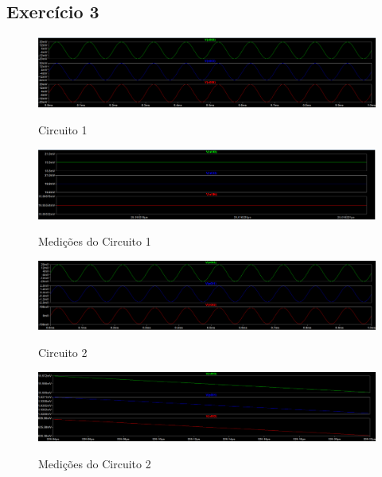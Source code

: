 \documentclass[journal, a4paper]{IEEEtran}
\begin{document}
        \subsection{Exercício 3}
            \begin{figure}[H]
                \begin{center}
                \caption{Circuito 1}
                \includegraphics[width=\columnwidth]{vsig1.png}
                \label{tabela2}
                \end{center}
            \end{figure}  
            \begin{figure}[H]
        		\begin{center}
        		\caption{Medições do Circuito 1}
        		\includegraphics[width=\columnwidth]{mede1.png}
        		\label{tabela2}
        		\end{center}
            \end{figure}  
            \begin{figure}[H]
        		\begin{center}
        		\caption{Circuito 2}
        		\includegraphics[width=\columnwidth]{vsig2.png}
        		\label{tabela2}
        		\end{center}
            \end{figure}  
            \begin{figure}[H]
        		\begin{center}
        		\caption{Medições do Circuito 2}
        		\includegraphics[width=\columnwidth]{mede2.png}
        		\label{tabela2}
        		\end{center}
        	\end{figure}   
\end{document}
